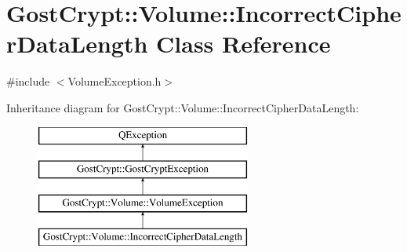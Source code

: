 \hypertarget{class_gost_crypt_1_1_volume_1_1_incorrect_cipher_data_length}{}\section{Gost\+Crypt\+:\+:Volume\+:\+:Incorrect\+Cipher\+Data\+Length Class Reference}
\label{class_gost_crypt_1_1_volume_1_1_incorrect_cipher_data_length}


{\ttfamily \#include $<$Volume\+Exception.\+h$>$}

Inheritance diagram for Gost\+Crypt\+:\+:Volume\+:\+:Incorrect\+Cipher\+Data\+Length\+:\begin{figure}[H]
\begin{center}
\leavevmode
\includegraphics[height=4.000000cm]{class_gost_crypt_1_1_volume_1_1_incorrect_cipher_data_length}
\end{center}
\end{figure}

